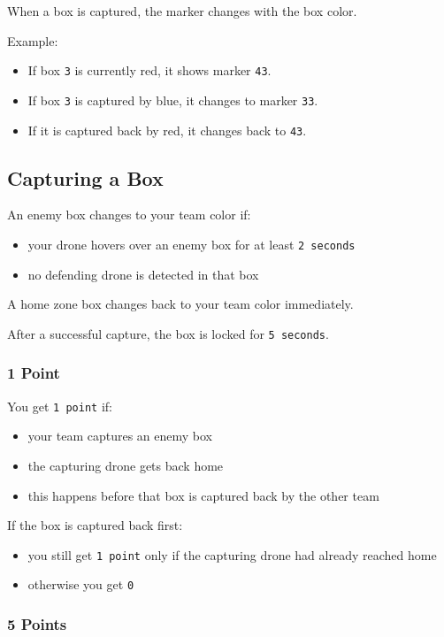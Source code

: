 When a box is captured, the marker changes with the box color.

Example:
\begin{itemize}
    \item If box \texttt{3} is currently red, it shows marker \texttt{43}.
    \item If box \texttt{3} is captured by blue, it changes to marker \texttt{33}.
    \item If it is captured back by red, it changes back to \texttt{43}.
\end{itemize}

\subsection{Capturing a Box}

An enemy box changes to your team color if:
\begin{itemize}
    \item your drone hovers over an enemy box for at least \texttt{2 seconds}
    \item no defending drone is detected in that box
\end{itemize}
A home zone box changes back to your team color immediately.

After a successful capture, the box is locked for \texttt{5 seconds}.

\subsubsection{1 Point}

You get \texttt{1 point} if:
\begin{itemize}
    \item your team captures an enemy box
    \item the capturing drone gets back home
    \item this happens before that box is captured back by the other team
\end{itemize}

If the box is captured back first:
\begin{itemize}
    \item you still get \texttt{1 point} only if the capturing drone had already reached home
    \item otherwise you get \texttt{0}
\end{itemize}

\subsubsection{5 Points}

